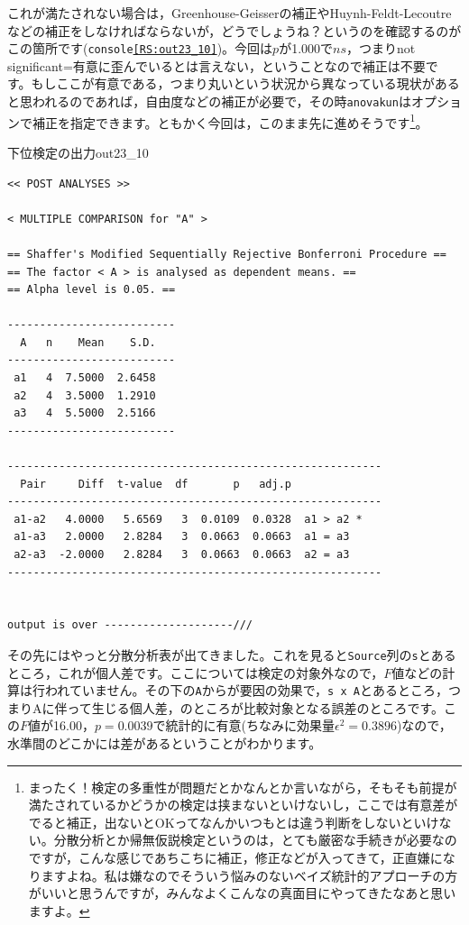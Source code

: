 \documentclass{ltjsarticle}
\begin{document}
これが満たされない場合は，Greenhouse-Geisserの補正やHuynh-Feldt-Lecoutreなどの補正をしなければならないが，どうでしょうね？というのを確認するのがこの箇所です(\texttt{console\ref{RS:out23_10}})。今回は$p$が1.000で$ns$，つまりnot significant=有意に歪んでいるとは言えない，ということなので補正は不要です。もしここが有意である，つまり丸いという状況から異なっている現状があると思われるのであれば，自由度などの補正が必要で，その時\texttt{anovakun}はオプションで補正を指定できます。ともかく今回は，このまま先に進めそうです\footnote{まったく！検定の多重性が問題だとかなんとか言いながら，そもそも前提が満たされているかどうかの検定は挟まないといけないし，ここでは有意差がでると補正，出ないとOKってなんかいつもとは違う判断をしないといけない。分散分析とか帰無仮説検定というのは，とても厳密な手続きが必要なのですが，こんな感じであちこちに補正，修正などが入ってきて，正直嫌になりますよね。私は嫌なのでそういう悩みのないベイズ統計的アプローチの方がいいと思うんですが，みんなよくこんなの真面目にやってきたなあと思いますよ。}。
\begin{Rscreen}{下位検定の出力}{out23_10}

    \begin{verbatim}
<< POST ANALYSES >>

< MULTIPLE COMPARISON for "A" >

== Shaffer's Modified Sequentially Rejective Bonferroni Procedure ==
== The factor < A > is analysed as dependent means. == 
== Alpha level is 0.05. == 
 
--------------------------
  A   n    Mean    S.D. 
--------------------------
 a1   4  7.5000  2.6458 
 a2   4  3.5000  1.2910 
 a3   4  5.5000  2.5166 
--------------------------

----------------------------------------------------------
  Pair     Diff  t-value  df       p   adj.p            
----------------------------------------------------------
 a1-a2   4.0000   5.6569   3  0.0109  0.0328  a1 > a2 * 
 a1-a3   2.0000   2.8284   3  0.0663  0.0663  a1 = a3   
 a2-a3  -2.0000   2.8284   3  0.0663  0.0663  a2 = a3   
----------------------------------------------------------


output is over --------------------///

\end{verbatim}
\end{Rscreen}
その先にはやっと分散分析表が出てきました。これを見ると\texttt{Source}列の\texttt{s}とあるところ，これが個人差です。ここについては検定の対象外なので，$F$値などの計算は行われていません。その下の\texttt{A}からが要因の効果で，\texttt{s x A}とあるところ，つまりAに伴って生じる個人差，のところが比較対象となる誤差のところです。この$F$値が16.00，$p=0.0039$で統計的に有意(ちなみに効果量$\epsilon^2=0.3896$)なので，水準間のどこかには差があるということがわかります。
\end{document}
